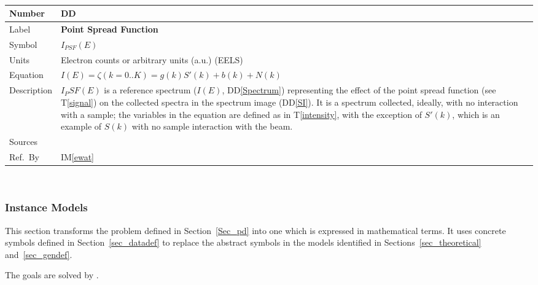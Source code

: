\documentclass[12pt]{article}
\newcommand{\colAwidth}{0.13\textwidth}
\newcommand{\colBwidth}{0.82\textwidth}
\newcounter{defnum} %
\newcounter{datadefnum} %
\newcommand{\ddref}[1]{DD\ref{#1}}
\newcommand{\tref}[1]{T\ref{#1}}
\newcommand{\iref}[1]{IM\ref{#1}}
\begin{document}
~\newline

\noindent
\begin{minipage}{\textwidth}
	\renewcommand*{\arraystretch}{1.5}
	\begin{tabular}{| p{\colAwidth} | p{\colBwidth}|}
		\hline
		\rowcolor[gray]{0.9}
		Number& DD{datadefnum}\thedatadefnum \label{PSF}\\
		\hline
		Label& \bf Point Spread Function\\
		\hline
		Symbol &$I_{PSF}(E)$\\
		\hline
		Units & Electron counts or arbitrary units (a.u.) (EELS)\\
		  \hline
		  Equation&$I(E) = \zeta(k={0..K}) = g(k) S'(k) + b(k) + N(k)$\\
		  \hline
		  Description & 
		               $I_PSF(E)$ is a reference spectrum ($I(E)$, \ddref{Spectrum}) representing the effect of the point spread function (see \tref{signal}) on the collected spectra in the spectrum image (\ddref{SI}). It is a spectrum collected, ideally, with no interaction with a sample; the variables in the equation are defined as in \tref{intensity}, with the exception of $S'(k)$, which is an example of $S(k)$ with no sample interaction with the beam.
		  \\
		  \hline
		  Sources&~\cite{zuo_electron_2000, jeanguillaume_spectrum-image:_1989, gloter_improving_2003}  \\
		  \hline
		  Ref.\ By & \iref{ewat}\\
		  \hline
	\end{tabular}
\end{minipage}\\

\subsubsection{Instance Models} \label{sec_instance}    

This section transforms the problem defined in Section~\ref{Sec_pd} into 
one which is expressed in mathematical terms. It uses concrete symbols defined 
in Section~\ref{sec_datadef} to replace the abstract symbols in the models 
identified in Sections~\ref{sec_theoretical} and~\ref{sec_gendef}.

The goals  are solved by .  
\end{document}
